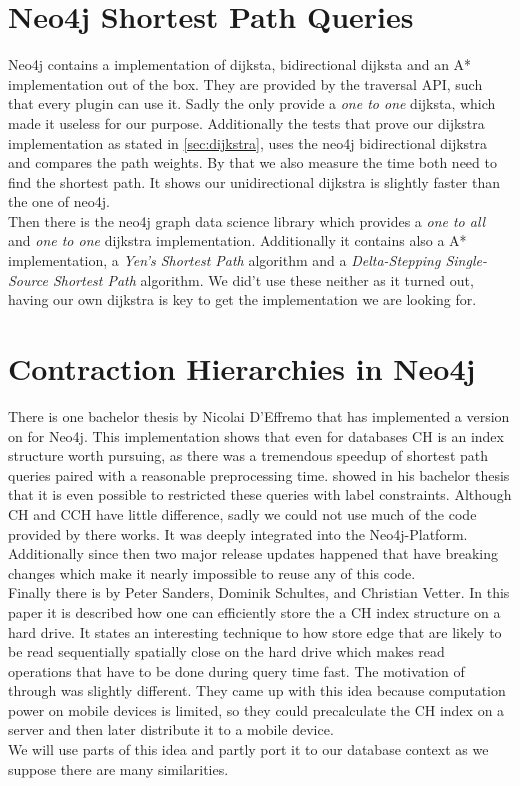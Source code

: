 \section{Neo4j Shortest Path Queries}

Neo4j contains a implementation of dijksta, bidirectional dijksta and an A* implementation out of the box.
They are provided by the traversal API, such that every plugin can use it.
Sadly the only provide a \textit{one to one} dijksta, which made it useless for our purpose.
Additionally the tests that prove our dijkstra implementation as stated in \ref{sec:dijkstra}, uses the neo4j bidirectional dijkstra and compares the path weights.
By that we also measure the time both need to find the shortest path.
It shows our unidirectional dijkstra is slightly faster than the one of neo4j.
\\
Then there is the neo4j graph data science library  which provides a \textit{one to all} and \textit{one to one} dijkstra implementation.
Additionally it contains also a A* implementation, a \textit{Yen’s Shortest Path} algorithm and a \textit{Delta-Stepping Single-Source Shortest Path} algorithm.
We did't use these neither as it turned out, having our own dijkstra is key to get the implementation we are looking for.

\section{Contraction Hierarchies in Neo4j}\label{sec:related_work:database}

There is one bachelor thesis by Nicolai D'Effremo \cite[Some text]{DEffremo2019} that has implemented a version on \cite[Contraction Hierarchies]{Geisberger_2012} for Neo4j.
This implementation shows that even for databases CH is an index structure worth pursuing, as there was a tremendous speedup of shortest path queries paired with a reasonable preprocessing time.
\cite{Zickenberg2021} showed in his bachelor thesis that it is even possible to restricted these queries with label constraints.
Although CH and CCH have little difference, sadly we could not use much of the code provided by there works.
It was deeply integrated into the Neo4j-Platform.
Additionally since then two major release updates happened that have breaking changes which make it nearly impossible to reuse any of this code.
\\
Finally there is \cite[Mobile Route Planning]{Sanders} by Peter Sanders, Dominik Schultes, and Christian Vetter.
In this paper it is described how one can efficiently store the a CH index structure on a hard drive.
It states an interesting technique to how store edge that are likely to be read sequentially spatially close on the hard drive which makes read operations that have to be done during query time fast.
The motivation of \cite[Mobile Route Planning]{Sanders} through was slightly different.
They came up with this idea because computation power on mobile devices is limited, so they could precalculate the CH index on a server and then later distribute it to a mobile device.
\\
We will use parts of this idea and partly port it to our database context as we suppose there are many similarities.
